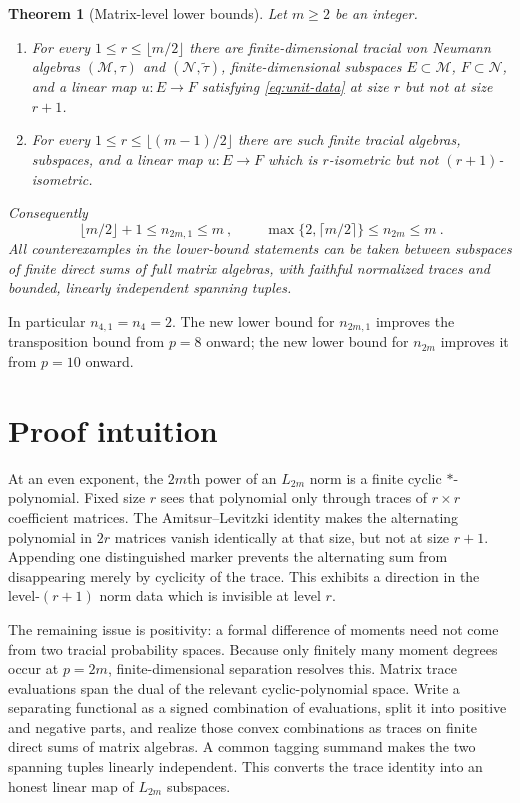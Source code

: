 \documentclass[11pt]{article}
\newtheorem{theorem}{Theorem}
\theoremstyle{remark}
\newcommand{\M}{\mathcal M}
\newcommand{\N}{\mathcal N}
\begin{document}
\begin{theorem}[Matrix-level lower bounds]\label{thm:main}
Let $m\ge2$ be an integer.
\begin{enumerate}[label=\textup{(\roman*)}]
\item For every $1\le r\le\lfloor m/2\rfloor$ there are finite-dimensional
tracial von Neumann algebras $(\M,\tau)$ and $(\N,\widetilde\tau)$,
finite-dimensional subspaces $E\subset\M$, $F\subset\N$, and a linear map
$u:E\to F$ satisfying \eqref{eq:unit-data} at size $r$ but not at size
$r+1$.
\item For every $1\le r\le\lfloor(m-1)/2\rfloor$ there are such finite
tracial algebras, subspaces, and a linear map $u:E\to F$ which is
$r$-isometric but not $(r+1)$-isometric.
\end{enumerate}
Consequently
\begin{equation}\label{eq:bounds}
 \boxed{\ \lfloor m/2\rfloor+1\le n_{2m,1}\le m\ },
 \qquad
 \boxed{\ \max\{2,\lceil m/2\rceil\}\le n_{2m}\le m\ }.
\end{equation}
All counterexamples in the lower-bound statements can be taken between
subspaces of finite direct sums of full matrix algebras, with faithful
normalized traces and bounded, linearly independent spanning tuples.
\end{theorem}

In particular $n_{4,1}=n_4=2$.  The new lower bound for $n_{2m,1}$ improves
the transposition bound from $p=8$ onward; the new lower bound for $n_{2m}$
improves it from $p=10$ onward.

\section{Proof intuition}

At an even exponent, the $2m$th power of an $L_{2m}$ norm is a finite cyclic
$*$-polynomial.  Fixed size $r$ sees that polynomial only through traces of
$r\times r$ coefficient matrices.  The Amitsur--Levitzki identity makes the
alternating polynomial in $2r$ matrices vanish identically at that size, but
not at size $r+1$.  Appending one distinguished marker prevents the
alternating sum from disappearing merely by cyclicity of the trace.  This
exhibits a direction in the level-$(r+1)$ norm data which is invisible at
level $r$.

The remaining issue is positivity: a formal difference of moments need not
come from two tracial probability spaces.  Because only finitely many moment
degrees occur at $p=2m$, finite-dimensional separation resolves this.  Matrix
trace evaluations span the dual of the relevant cyclic-polynomial space.
Write a separating functional as a signed combination of evaluations, split
it into positive and negative parts, and realize those convex combinations
as traces on finite direct sums of matrix algebras.  A common tagging summand
makes the two spanning tuples linearly independent.  This converts the trace
identity into an honest linear map of $L_{2m}$ subspaces.
\end{document}
